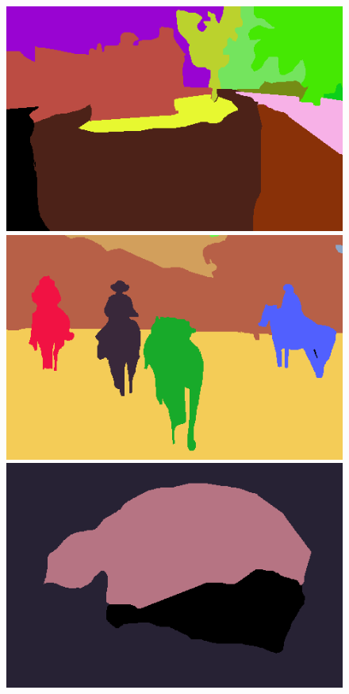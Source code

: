 \begin{figure}[h]
{\begin{minipage}[b]{0.13\linewidth}
\includegraphics[width=1\linewidth]{figures/img/gt/gt_92014.png}
\includegraphics[width=1\linewidth]{figures/img/gt/gt_220003.png}
\includegraphics[width=1\linewidth]{figures/img/gt/gt_176051.png}

\end{minipage}}
\end{figure}
